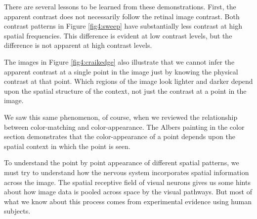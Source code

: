 There are several lessons to be learned
from these demonstrations.
First, the apparent contrast 
does not necessarily follow the retinal image contrast.
Both contrast patterns in Figure \ref{fig4:sweep}
have substantially less contrast at high spatial
frequencies.
This difference is evident at low contrast levels,
but the difference is not apparent
at high contrast levels.

The images in Figure \ref{fig4:craikedge} also illustrate
that we cannot infer the apparent
contrast at a single point in the image
just by knowing the physical contrast at that point.
Which regions of the image look lighter and darker depend
upon the spatial structure of the context,
not just the contrast at a point in the image.

We saw this same phenomenon, of course, when we
reviewed the relationship between color-matching and color-appearance.
The Albers painting in the color section demonstrates that the
color-appearance of a point depends upon the spatial context
in which the point is seen.

To understand the point by point
appearance of different spatial patterns,
we must try to understand how the nervous system
incorporates spatial information across the image.
The spatial receptive field of visual neurons gives us
some hints about how image data is pooled across space
by the visual pathways.
But most of what we know about this process comes from
experimental evidence using human subjects.

